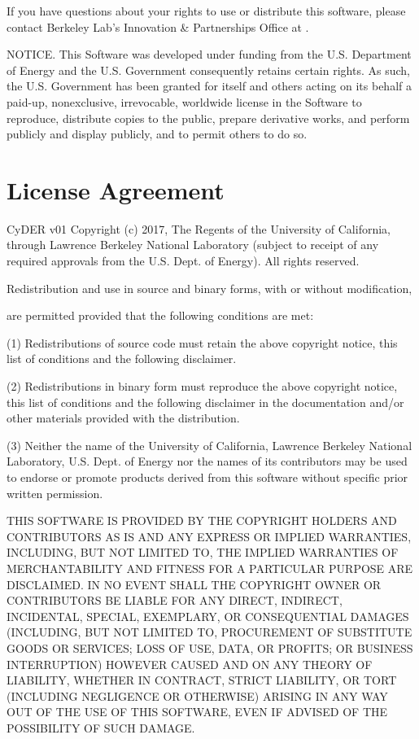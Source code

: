 \documentclass[letterpaper,10pt,english]{sphinxmanual}
\begin{document}
If you have questions about your rights to use or distribute this software,
please contact Berkeley Lab's Innovation \& Partnerships Office at  .

NOTICE.  This Software was developed under funding from the U.S.
Department of Energy and the U.S. Government consequently retains certain rights.
As such, the U.S. Government has been granted for itself and others acting on
its behalf a paid-up, nonexclusive, irrevocable, worldwide license in the Software
to reproduce, distribute copies to the public, prepare derivative works,
and perform publicly and display publicly, and to permit others to do so.


\section{License Agreement}
\label{\detokenize{legal:license-agreement}}
\sphinxquotedblleft{}CyDER v01\sphinxquotedblright{} Copyright (c) 2017, The Regents of the University of California,
through Lawrence Berkeley National Laboratory (subject to receipt of any
required approvals from the U.S. Dept. of Energy).  All rights reserved.

Redistribution and use in source and binary forms, with or without modification,

are permitted provided that the following conditions are met:

(1) Redistributions of source code must retain the above copyright notice,
this list of conditions and the following disclaimer.

(2) Redistributions in binary form must reproduce the above copyright notice,
this list of conditions and the following disclaimer in the documentation
and/or other materials provided with the distribution.

(3) Neither the name of the University of California,
Lawrence Berkeley National Laboratory, U.S. Dept. of Energy nor the names
of its contributors may be used to endorse or promote products derived
from this software without specific prior written permission.

THIS SOFTWARE IS PROVIDED BY THE COPYRIGHT HOLDERS AND CONTRIBUTORS
\sphinxquotedblleft{}AS IS\sphinxquotedblright{} AND ANY EXPRESS OR IMPLIED WARRANTIES, INCLUDING, BUT NOT LIMITED
TO, THE IMPLIED WARRANTIES OF MERCHANTABILITY AND FITNESS FOR A PARTICULAR
PURPOSE ARE DISCLAIMED. IN NO EVENT SHALL THE COPYRIGHT OWNER OR CONTRIBUTORS
BE LIABLE FOR ANY DIRECT, INDIRECT, INCIDENTAL, SPECIAL, EXEMPLARY,
OR CONSEQUENTIAL DAMAGES (INCLUDING, BUT NOT LIMITED TO, PROCUREMENT
OF SUBSTITUTE GOODS OR SERVICES; LOSS OF USE, DATA, OR PROFITS;
OR BUSINESS INTERRUPTION) HOWEVER CAUSED AND ON ANY THEORY OF LIABILITY,
WHETHER IN CONTRACT, STRICT LIABILITY, OR TORT (INCLUDING NEGLIGENCE OR OTHERWISE)
ARISING IN ANY WAY OUT OF THE USE OF THIS SOFTWARE, EVEN IF ADVISED OF THE POSSIBILITY OF SUCH DAMAGE.
\end{document}

